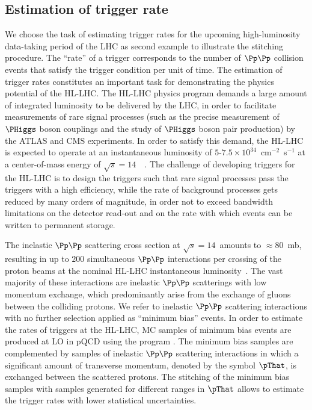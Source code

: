 \subsection{Estimation of trigger rate}
\label{sec:examples_trigger_rate}

We choose the task of estimating trigger rates for the upcoming high-luminosity data-taking period of the LHC as second example to illustrate the stitching procedure.
The ``rate'' of a trigger corresponds to the number of $\Pp\Pp$ collision events that satisfy the trigger condition per unit of time.
The estimation of trigger rates constitutes an important task for demonstrating the physics potential of the HL-LHC.
The HL-LHC physics program demands a large amount of integrated luminosity to be delivered by the LHC, 
in order to facilitate measurements of rare signal processes
(such as the precise measurement of $\PHiggs$ boson couplings and the study of $\PHiggs$ boson pair production) by the ATLAS and CMS experiments.
In order to satisfy this demand, the HL-LHC is expected to operate at an instantaneous luminosity of $5$-$7.5 \times 10^{34}$~cm$^{-2}$~s$^{-1}$
at a center-of-mass energy of $\sqrt{s} = 14$~\TeV~\cite{TDR_Phase2_LHC}.
The challenge of developing triggers for the HL-LHC is to design the triggers such that rare signal processes pass the triggers with a high efficiency,
while the rate of background processes gets reduced by many orders of magnitude, in order not to exceed bandwidth limitations on the detector read-out 
and on the rate with which events can be written to permanent storage.

The inelastic $\Pp\Pp$ scattering cross section at $\sqrt{s} = 14$~\TeV amounts to $\approx 80$~mb,
resulting in up to $200$ simultaneous $\Pp\Pp$ interactions per crossing of the proton beams at the nominal HL-LHC instantaneous luminosity~\cite{TDR_Phase2_LHC}.
The vast majority of these interactions are inelastic $\Pp\Pp$ scatterings with low momentum exchange,
which predominantly arise from the exchange of gluons between the colliding protons.
We refer to inelastic $\Pp\Pp$ scattering interactions with no further selection applied as ``minimum bias'' events.
In order to estimate the rates of triggers at the HL-LHC,
MC samples of minimum bias events are produced at LO in pQCD using the program \PYTHIA.
The minimum bias samples are complemented by samples of inelastic $\Pp\Pp$ scattering interactions
in which a significant amount of transverse momentum, denoted by the symbol $\pThat$, is exchanged between the scattered protons.
The stitching of the minimum bias samples with samples generated for different ranges in $\pThat$ allows to estimate the trigger rates with lower statistical uncertainties.

